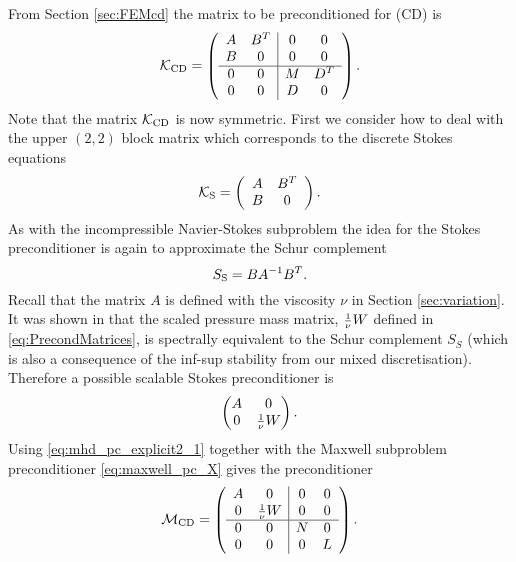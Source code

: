 From Section \ref{sec:FEMcd} the matrix to be preconditioned for (CD) is
\begin{equation}
\label{eq:Kcd}
 \mathcal{K}_{\rm CD} = \left(
\begin{array}{cc|cc}
A & B^T & 0 & 0\\
B & 0 & 0 & 0 \\
\hline
0 & 0 & M & D^T\\
0 & 0 & D & 0
\end{array}
\right).
\end{equation}
Note that the matrix $\mathcal{K}_{\rm CD}$ is now symmetric. First we consider how to deal with the upper $(2,2)$ block matrix which corresponds to the discrete Stokes equations
\begin{equation}\nonumber
   \mathcal{K}_{\rm S} =
    \left(
    \begin{array}{cc}
    A& B^T \\
    B & 0
    \end{array}
    \right).
\end{equation}
As with the incompressible Navier-Stokes subproblem the idea for the Stokes preconditioner is again to approximate the Schur complement
$$S_{\rm S} =  BA^{-1}B^T.$$
Recall that the matrix $A$ is defined with the viscosity $\nu$ in Section \ref{sec:variation}. It was shown in \cite{silvester1993fast,silvester1994fast} that the scaled pressure mass matrix, $\mbox{\small \(\frac{1}{\nu}\)} W$ defined in \eqref{eq:PrecondMatrices}, is spectrally equivalent to the Schur complement $S_S$ (which is also a consequence of the inf-sup stability from our mixed discretisation). Therefore a possible scalable Stokes preconditioner is
\begin{equation}
\label{eq:mhd_pc_explicit2_1}
\begin{pmatrix}
A & 0 \\
0 & \mbox{\small \(\frac{1}{\nu}\)} W
\end{pmatrix}.
\end{equation}
Using \eqref{eq:mhd_pc_explicit2_1} together with the Maxwell subproblem preconditioner  \eqref{eq:maxwell_pc_X} gives the preconditioner
\begin{equation}
\label{eq:mhd_pc_explicit2}
\mathcal{M}_{\rm CD} =
\left(
\begin{array}{cc|cc}
A & 0 & 0 & 0\\
0 & \mbox{\small \(\frac{1}{\nu}\)} W & 0 & 0 \\
\hline
0 & 0 & N & 0\\
0 & 0 & 0 & L
\end{array}
\right).
\end{equation}

